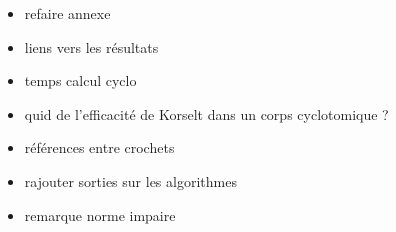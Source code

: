\begin{itemize}
	\item refaire annexe
	\item liens vers les résultats
	\item temps calcul cyclo
	\item quid de l'efficacité de Korselt dans un corps cyclotomique ?
	\item références entre crochets
	\item rajouter sorties sur les algorithmes
	\item remarque norme impaire
\end{itemize}
